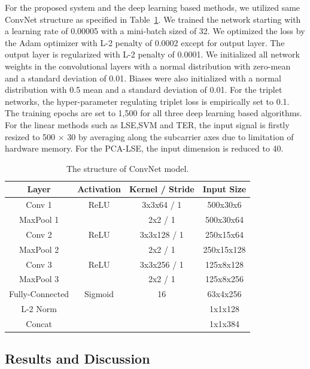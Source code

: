 \documentclass[runningheads]{llncs}
\begin{document}
For the proposed system and the deep learning based methods, we utilized same ConvNet structure as specified in Table~\ref{tab1}. We trained the network starting with a learning rate of 0.00005 with a mini-batch sized of 32. We optimized the loss by the Adam optimizer with L-2 penalty of 0.0002 except for output layer. The output layer is regularized with L-2 penalty of 0.0001. We initialized all network weights in the convolutional layers with a normal distribution with zero-mean and a standard deviation of 0.01. Biases were also initialized with a normal distribution with 0.5 mean and a standard deviation of 0.01. For the triplet networks, the hyper-parameter regulating triplet loss is empirically set to 0.1. The training epochs are set to 1,500 for all three deep learning based algorithms. For the linear methods such as LSE,SVM and TER, the input signal is firstly resized to 500 $\times$ 30 by averaging along the subcarrier axes due to limitation of hardware memory. For the PCA-LSE, the input dimension is reduced to 40.
 
 \begin{table}[]
    \caption{The structure of ConvNet model.}\label{tab1}
    \centering
    \begin{tabular}{|c|c|c|c|}
    \hline
    Layer     & Activation & Kernel / Stride & Input Size \\ \hline
    Conv 1    & ReLU       & 3x3x64 / 1      & 500x30x6   \\
    MaxPool 1 &            & 2x2 / 1         & 500x30x64  \\
    Conv 2    & ReLU       & 3x3x128 / 1     & 250x15x64 \\
    MaxPool 2 &            & 2x2 / 1         & 250x15x128 \\
    Conv 3    & ReLU       & 3x3x256 / 1     & 125x8x128  \\
    MaxPool 3 &            & 2x2 / 1         & 125x8x256  \\
    Fully-Connected     & Sigmoid    & 16             & 63x4x256   \\
    L-2 Norm  &            &                 & 1x1x128    \\
    Concat    &            &                 & 1x1x384    \\ \hline
    \end{tabular}
\end{table}

\subsection{Results and Discussion}
\end{document}
